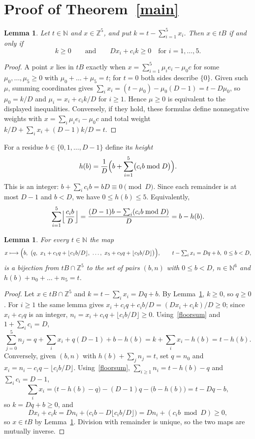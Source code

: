 \documentclass[11pt]{article}
\newtheorem{lemma}[theorem]{Lemma}
\theoremstyle{remark}
\newcommand{\ZZ}{\mathbb{Z}}
\newcommand{\NN}{\mathbb{N}}
\begin{document}
\section{Proof of Theorem~\ref{main}}\label{sec:proof}

\begin{lemma}\label{membership}
Let $t\in\NN$ and $x\in\ZZ^5$, and put $k=t-\sum_{i=1}^5x_i$. Then $x\in tB$ if and only if
\[
k\ge0\qquad\text{and}\qquad Dx_i+c_ik\ge0\quad\text{for } i=1,\dots,5 .
\]
\end{lemma}

\begin{proof}
A point $x$ lies in $tB$ exactly when $x=\sum_{i=1}^5\mu_ie_i-\mu_0c$ for some $\mu_0,\dots,\mu_5\ge0$ with $\mu_0+\dots+\mu_5=t$; for $t=0$ both sides describe $\{0\}$. Given such $\mu$, summing coordinates gives $\sum_ix_i=(t-\mu_0)-\mu_0(D-1)=t-D\mu_0$, so $\mu_0=k/D$ and $\mu_i=x_i+c_ik/D$ for $i\ge1$. Hence $\mu\ge0$ is equivalent to the displayed inequalities. Conversely, if they hold, these formulas define nonnegative weights with $x=\sum_i\mu_ie_i-\mu_0c$ and total weight $k/D+\sum_ix_i+(D-1)k/D=t$.
\end{proof}

For a residue $b\in\{0,1,\dots,D-1\}$ define its \emph{height}
\[
h(b)=\frac{1}{D}\Bigl(b+\sum_{i=1}^5\bigl(c_ib\bmod D\bigr)\Bigr).
\]
This is an integer: $b+\sum_ic_ib=bD\equiv0\pmod D$. Since each remainder is at most $D-1$ and $b<D$, we have $0\le h(b)\le5$. Equivalently,
\begin{equation}\label{floorsum}
\sum_{i=1}^5\Bigl\lfloor\frac{c_ib}{D}\Bigr\rfloor=\frac{(D-1)b-\sum_i(c_ib\bmod D)}{D}=b-h(b).
\end{equation}

\begin{lemma}\label{bijection}
For every $t\in\NN$ the map
\[
x\longmapsto\Bigl(b,\ \bigl(q,\ x_1+c_1q+\lfloor c_1b/D\rfloor,\ \dots,\ x_5+c_5q+\lfloor c_5b/D\rfloor\bigr)\Bigr),
\qquad t-\textstyle\sum_ix_i=Dq+b,\ 0\le b<D,
\]
is a bijection from $tB\cap\ZZ^5$ to the set of pairs $(b,n)$ with $0\le b<D$, $n\in\NN^6$ and $h(b)+n_0+\dots+n_5=t$.
\end{lemma}

\begin{proof}
Let $x\in tB\cap\ZZ^5$ and $k=t-\sum_ix_i=Dq+b$. By Lemma~\ref{membership}, $k\ge0$, so $q\ge0$. For $i\ge1$ the same lemma gives $x_i+c_iq+c_ib/D=(Dx_i+c_ik)/D\ge0$; since $x_i+c_iq$ is an integer, $n_i=x_i+c_iq+\lfloor c_ib/D\rfloor\ge0$. Using~\eqref{floorsum} and $1+\sum_ic_i=D$,
\[
\sum_{j=0}^5n_j=q+\sum_ix_i+q(D-1)+b-h(b)=k+\sum_ix_i-h(b)=t-h(b).
\]
Conversely, given $(b,n)$ with $h(b)+\sum_jn_j=t$, set $q=n_0$ and $x_i=n_i-c_iq-\lfloor c_ib/D\rfloor$. Using~\eqref{floorsum}, $\sum_{i\ge1}n_i=t-h(b)-q$ and $\sum_ic_i=D-1$,
\[
\sum_ix_i=\bigl(t-h(b)-q\bigr)-(D-1)q-\bigl(b-h(b)\bigr)=t-Dq-b,
\]
so $k=Dq+b\ge0$, and
\[
Dx_i+c_ik=Dn_i+\bigl(c_ib-D\lfloor c_ib/D\rfloor\bigr)=Dn_i+(c_ib\bmod D)\ge0,
\]
so $x\in tB$ by Lemma~\ref{membership}. Division with remainder is unique, so the two maps are mutually inverse.
\end{proof}
\end{document}
